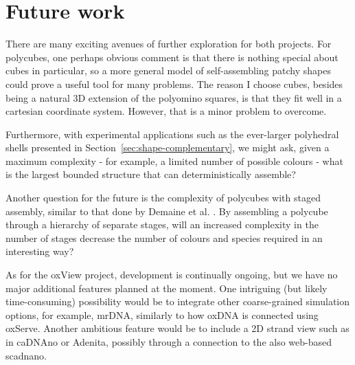 \section{Future work}

There are many exciting avenues of further exploration for both projects. For polycubes, one perhaps obvious comment is that there is nothing special about cubes in particular, so a more general model of self-assembling patchy shapes could prove a useful tool for many problems. The reason I choose cubes, besides being a natural 3D extension of the polyomino squares, is that they fit well in a cartesian coordinate system. However, that is a minor problem to overcome.


Furthermore, with experimental applications such as the ever-larger polyhedral shells presented in Section~\ref{sec:shape-complementary}, we might ask, given a maximum complexity - for example, a limited number of possible colours - what is the largest bounded structure that can deterministically assemble?

Another question for the future is the complexity of polycubes with staged assembly, similar to that done by Demaine et al. \cite{demaine2008staged}. By assembling a polycube through a hierarchy of separate stages, will an increased complexity in the number of stages decrease the number of colours and species required in an interesting way?

As for the oxView project, development is continually ongoing, but we have no major additional features planned at the moment. One intriguing (but likely time-consuming) possibility would be to integrate other coarse-grained simulation options, for example, mrDNA, similarly to how oxDNA is connected using oxServe.
Another ambitious feature would be to include a 2D strand view such as in caDNAno or Adenita, possibly through a connection to the also web-based scadnano.